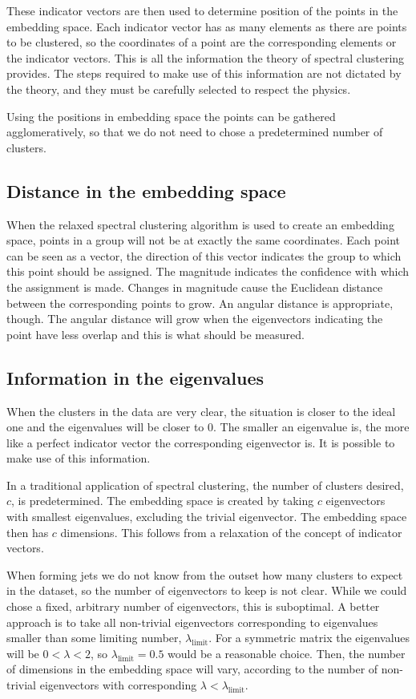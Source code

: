These indicator vectors are then used to determine position of the points in the embedding space.
Each indicator vector has as many elements as there are points to be clustered,
so the coordinates of a point are the corresponding elements or the indicator vectors.
This is all the information the theory of spectral clustering provides.
The steps required to make use of this information are not dictated by the theory,
and they must be carefully selected to respect the physics.

Using the positions in embedding space the points can be gathered agglomeratively,
so that we do not need to chose a predetermined number of clusters.

\subsection{Distance in the embedding space}\label{sec:embedding_distance}
When the relaxed spectral clustering algorithm is used to create an embedding space, points in a group will not be at exactly the same coordinates.
Each point can be seen as a vector, the direction of this vector indicates the group to which this point should be assigned.
The magnitude indicates the confidence with which the assignment is made.
Changes in magnitude cause the Euclidean distance between the corresponding points to grow.
An angular distance is appropriate, though. 
The angular distance will grow when the eigenvectors indicating the point have less overlap
and this is what should be measured.

\subsection{Information in the eigenvalues}\label{sec:eig_norm}
When the clusters in the data are very clear, the situation is closer to the ideal one and the eigenvalues will be closer to \(0\).
The smaller an eigenvalue is, the more like a perfect indicator vector the corresponding eigenvector is.
It is possible to make use of this information.

In a traditional application of spectral clustering, the number of clusters desired, \(c\), is predetermined.
The embedding space is created by taking \(c\) eigenvectors with smallest eigenvalues, excluding the trivial eigenvector.
The embedding space then has \(c\) dimensions.
This follows from a relaxation of the concept of indicator vectors.

When forming jets we do not know from the outset how many clusters to expect in the dataset,
so the number of eigenvectors to keep is not clear.
While we could chose a fixed, arbitrary number of eigenvectors, this is suboptimal.
A better approach is to take all non-trivial eigenvectors corresponding to eigenvalues
smaller than some limiting number, \(\lambda_\text{limit}\).
For a symmetric matrix the eigenvalues will be \(0 < \lambda < 2\),
so \(\lambda_\text{limit} = 0.5\) would be a reasonable choice.
Then, the number of dimensions in the embedding space will vary,
according to the number of non-trivial eigenvectors with corresponding \(\lambda < \lambda_\text{limit}\).

